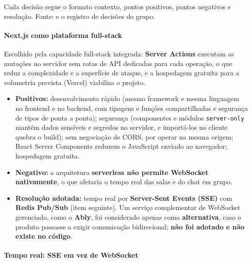 \documentclass[
  brazilian,
  11pt,
]{article}
\providecommand{\tightlist}{%
  \setlength{\itemsep}{0pt}\setlength{\parskip}{0pt}}
\begin{document}
Cada decisão segue o formato contexto, pontos positivos, pontos negativos e resolução. Fonte:  e o registro de decisões do grupo.

\paragraph{Next.js como plataforma full-stack}\label{next.js-como-plataforma-full-stack}

Escolhido pela capacidade full-stack integrada: \textbf{Server Actions} executam as mutações no servidor sem rotas de API dedicadas para cada operação, o que reduz a complexidade e a superfície de ataque, e a hospedagem gratuita para a volumetria prevista (Vercel) viabiliza o projeto.

\begin{itemize}
\tightlist
\item
  \textbf{Positivos:} desenvolvimento rápido (mesmo framework e mesma linguagem no frontend e no backend, com tipagens e funções compartilhadas e segurança de tipos de ponta a ponta); segurança (componentes e módulos \texttt{server-only} mantêm dados sensíveis e segredos no servidor, e importá-los no cliente quebra o build); sem negociação de CORS, por operar na mesma origem; React Server Components reduzem o JavaScript enviado ao navegador; hospedagem gratuita.
\item
  \textbf{Negativo:} a arquitetura \textbf{serverless não permite WebSocket nativamente}, o que afetaria o tempo real das salas e do chat em grupo.
\item
  \textbf{Resolução adotada:} tempo real por \textbf{Server-Sent Events (SSE)} com \textbf{Redis Pub/Sub} (item seguinte). Um serviço complementar de WebSocket gerenciado, como o \textbf{Ably}, foi considerado apenas como \textbf{alternativa}, caso o produto passasse a exigir comunicação bidirecional; \textbf{não foi adotado e não existe no código}.
\end{itemize}

\paragraph{Tempo real: SSE em vez de WebSocket}\label{tempo-real-sse-em-vez-de-websocket}
\end{document}
